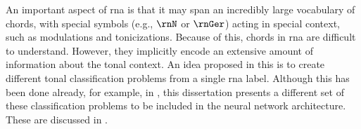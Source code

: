 
An important aspect of \gls{rna} is that it may span an
incredibly large vocabulary of chords, with special symbols
(e.g., $\rnN$ or $\rnGer$) acting in special context, such
as modulations and tonicizations. Because of this, chords in
\gls{rna} are difficult to understand. However, they
implicitly encode an extensive amount of information about
the tonal context. An idea proposed in this \thesisdiss{} is
to create different tonal classification problems from a
single \gls{rna} label. Although this has been done already,
for example, in \textcite{chen2018functional}, this
dissertation presents a different set of these
classification problems to be included in the neural network
architecture. These are discussed in
.
